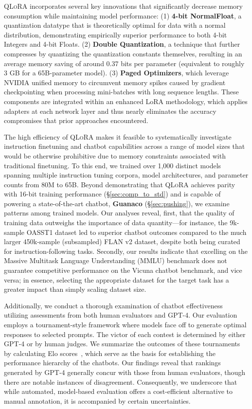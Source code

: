 \textsc{QLoRA} incorporates several key innovations that significantly decrease memory consumption while maintaining model performance: (1) \textbf{4-bit NormalFloat}, a quantization datatype that is theoretically optimal for data with a normal distribution, demonstrating empirically superior performance to both 4-bit Integers and 4-bit Floats. (2) \textbf{Double Quantization}, a technique that further compresses by quantizing the quantization constants themselves, resulting in an average memory saving of around 0.37 bits per parameter (equivalent to roughly 3 GB for a 65B-parameter model). (3) \textbf{Paged Optimizers}, which leverage NVIDIA unified memory to circumvent memory spikes caused by gradient checkpointing when processing mini-batches with long sequence lengths. These components are integrated within an enhanced LoRA methodology, which applies adapters at each network layer and thus nearly eliminates the accuracy compromises that prior approaches encountered.

The high efficiency of \textsc{QLoRA} makes it feasible to systematically investigate instruction finetuning and chatbot capabilities across a range of model sizes that would be otherwise prohibitive due to memory constraints associated with traditional finetuning. To this end, we trained over 1,000 distinct models spanning multiple instruction tuning corpora, model architectures, and parameter counts from 80M to 65B. Beyond demonstrating that \textsc{QLoRA} achieves parity with 16-bit training performance (\S\ref{sec:comp_to_std}) and is capable of powering a state-of-the-art chatbot, \textbf{Guanaco} (\S\ref{sec:pushing}), we examine patterns among trained models. Our analyses reveal, first, that the quality of training data outweighs the importance of data quantity—for instance, the 9k-sample OASST1 dataset led to superior chatbot outcomes compared to the much larger 450k-sample (subsampled) FLAN v2 dataset, despite both being curated for instruction-following tasks. Secondly, our results indicate that excelling on the Massive Multitask Language Understanding (MMLU) benchmark does not guarantee competitive performance on the Vicuna chatbot benchmark, and vice versa; in essence, selecting the appropriate dataset for the target task has a greater impact than simply scaling dataset size.

Additionally, we conduct a thorough examination of chatbot effectiveness utilizing assessments from both human evaluators and GPT-4. Our evaluation employs a tournament-style framework where models face off to generate optimal responses to selected prompts. The victor of each contest is determined by either GPT-4 or by human judges. We summarize the outcomes of these tournaments by calculating Elo scores~\citep{elo1967proposed, elo1978rating}, which serve as the basis for establishing the performance hierarchy of the chatbots. Our findings reveal that rankings generated by GPT-4 generally concur with those from human evaluators, though there are notable instances of disagreement. Consequently, we underscore that while automated, model-based evaluation offers a cost-efficient alternative to manual annotation, it is accompanied by certain uncertainties.


